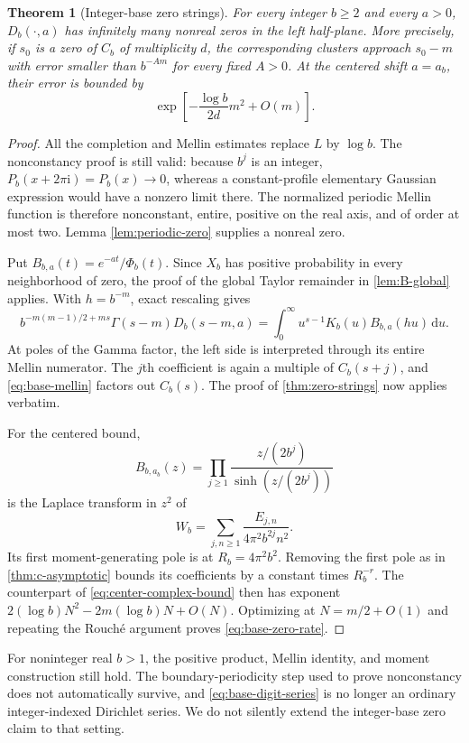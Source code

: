 \documentclass[11pt,a4paper]{article}
\numberwithin{equation}{section}
\newtheorem{theorem}{Theorem}[section]
\theoremstyle{definition}
\theoremstyle{remark}
\newcommand{\ii}{\mathrm i}
\newcommand{\dd}{\,\mathrm d}
\begin{document}
\begin{theorem}[Integer-base zero strings]
\label{thm:base-zeros}
For every integer $b\ge2$ and every $a>0$, $D_b(\cdot,a)$ has
infinitely many nonreal zeros in the left half-plane. More precisely,
if $s_0$ is a zero of $C_b$ of multiplicity $d$, the corresponding
clusters approach $s_0-m$ with error smaller than $b^{-Am}$ for
every fixed $A>0$.
At the centered shift $a=a_b$, their error is bounded by
\begin{equation}
 \exp\left[-\frac{\log b}{2d}m^2+O(m)\right].
 \label{eq:base-zero-rate}
\end{equation}
\end{theorem}
\begin{proof}
All the completion and Mellin estimates replace $L$ by $\log b$.
The nonconstancy proof is still valid: because $b^j$ is an integer,
$P_b(x+2\pi\ii)=P_b(x)\to0$, whereas a constant-profile elementary
Gaussian expression would have a nonzero limit there.
The normalized periodic Mellin function is therefore nonconstant,
entire, positive on the real axis, and of order at most two.
Lemma \ref{lem:periodic-zero} supplies a nonreal zero.

Put $B_{b,a}(t)=e^{-at}/\Phi_b(t)$. Since $X_b$ has positive
probability in every neighborhood of zero, the proof of the global
Taylor remainder in \cref{lem:B-global} applies. With $h=b^{-m}$,
exact rescaling gives
\[
 b^{-m(m-1)/2+ms}\Gamma(s-m)D_b(s-m,a)
 =\int_0^\infty u^{s-1}K_b(u)B_{b,a}(hu)\dd u.
\]
At poles of the Gamma factor, the left side is interpreted through
its entire Mellin numerator. The $j$th coefficient is again a multiple of $C_b(s+j)$, and
\cref{eq:base-mellin} factors out $C_b(s)$. The proof of
\cref{thm:zero-strings} now applies verbatim.

For the centered bound,
\[
 B_{b,a_b}(z)=\prod_{j\ge1}
       \frac{z/(2b^j)}{\sinh(z/(2b^j))}
\]
is the Laplace transform in $z^2$ of
\[
 W_b=\sum_{j,n\ge1}\frac{E_{j,n}}{4\pi^2b^{2j}n^2}.
\]
Its first moment-generating pole is at $R_b=4\pi^2b^2$.
Removing the first pole as in \cref{thm:c-asymptotic} bounds its
coefficients by a constant times $R_b^{-r}$. The counterpart of
\cref{eq:center-complex-bound} then has exponent
$2(\log b)N^2-2m(\log b)N+O(N)$.
Optimizing at $N=m/2+O(1)$ and repeating the Rouch\'e argument
proves \cref{eq:base-zero-rate}.
\end{proof}

For noninteger real $b>1$, the positive product, Mellin identity,
and moment construction still hold. The boundary-periodicity step
used to prove nonconstancy does not automatically survive, and
\cref{eq:base-digit-series} is no longer an ordinary integer-indexed
Dirichlet series. We do not silently extend the integer-base zero
claim to that setting.
\end{document}
